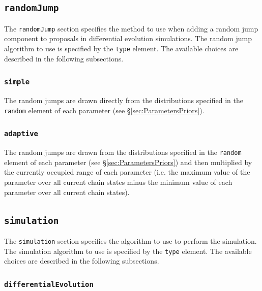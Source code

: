 \subsection{{\tt randomJump}}

The {\tt randomJump} section specifies the method to use when adding a random jump component to proposals in differential evolution simulations. The random jump algorithm to use is specified by the {\tt type} element. The available choices are described in the following subsections.

\subsubsection{{\tt simple}}

The random jumps are drawn directly from the distributions specified in the {\tt random} element of each parameter (see \S\ref{sec:ParametersPriors}).

\subsubsection{{\tt adaptive}}

The random jumps are drawn from the distributions specified in the {\tt random} element of each parameter (see \S\ref{sec:ParametersPriors}) and then multiplied by the currently occupied range of each parameter (i.e. the maximum value of the parameter over all current chain states minus the minimum value of each parameter over all current chain states).

\subsection{{\tt simulation}}

The {\tt simulation} section specifies the algorithm to use to perform the simulation. The simulation algorithm to use is specified by the {\tt type} element. The available choices are described in the following subsections.

\subsubsection{{\tt differentialEvolution}}

